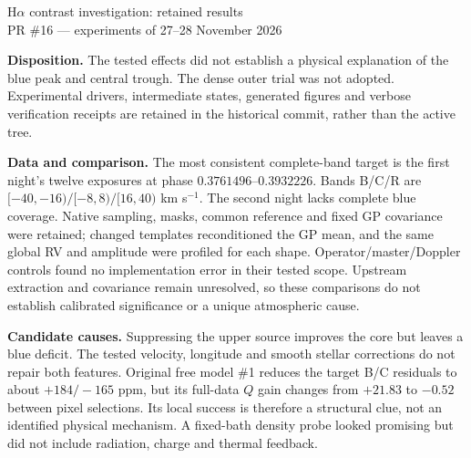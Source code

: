 \documentclass[10pt,a4paper]{article}
\begin{document}
\begin{center}
{\Large H$\alpha$ contrast investigation: retained results}\\
PR \#16 --- experiments of 27--28 November 2026
\end{center}

\textbf{Disposition.}
The tested effects did not establish a physical explanation of the blue peak
and central trough. The dense outer trial was not adopted. Experimental
drivers, intermediate states, generated figures and verbose verification
receipts are retained in the historical commit, rather than the active tree.

\textbf{Data and comparison.}
The most consistent complete-band target is the first night's twelve
exposures at phase $0.3761496$--$0.3932226$. Bands B/C/R are
$[-40,-16)/[-8,8)/[16,40)$ km s$^{-1}$. The second night lacks complete blue
coverage. Native sampling, masks, common reference and fixed GP covariance
were retained; changed templates reconditioned the GP mean, and the same
global RV and amplitude were profiled for each shape. Operator/master/Doppler
controls found no implementation error in their tested scope. Upstream
extraction and covariance remain unresolved, so these comparisons do not
establish calibrated significance or a unique atmospheric cause.

\textbf{Candidate causes.}
Suppressing the upper source improves the core but leaves a blue deficit.
The tested velocity, longitude and smooth stellar corrections do not repair
both features. Original free model \#1 reduces the target B/C residuals to
about $+184/-165$ ppm, but its full-data $Q$ gain changes from $+21.83$ to
$-0.52$ between pixel selections. Its local success is therefore a structural
clue, not an identified physical mechanism. A fixed-bath density probe looked
promising but did not include radiation, charge and thermal feedback.
\end{document}
